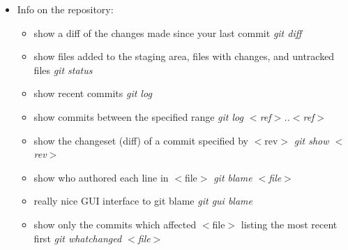 \begin{itemize}
\item Info on the repository:
   \begin{itemize}
          \item show a diff of the changes made since your last commit \textit{git diff}
	  \item show files added to the staging area, files with changes, and untracked files \textit{git status}
	  \item show recent commits \textit{git log}
	  \item show commits between the specified range \textit{git log $<$ref$>$..$<$ref$>$}
	  \item show the changeset (diff) of a commit specified by $<$rev$>$ \textit{git show $<$rev$>$}
	  \item show who authored each line in $<$file$>$ \textit{ git blame $<$file$>$ }
	  \item really nice GUI interface to git blame \textit{ git gui blame}
	  \item show only the commits which affected $<$file$>$ listing the most recent first \textit{git whatchanged $<$file$>$}
   \end{itemize}     


\end{itemize}
